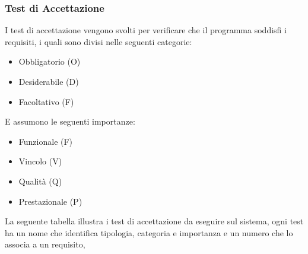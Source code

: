 \subsubsection{Test di Accettazione}
I test di accettazione vengono svolti per verificare che il programma soddisfi i requisiti, i quali sono divisi nelle seguenti categorie:
\begin{itemize}
    \item Obbligatorio (O)
    \item Desiderabile (D)
    \item Facoltativo (F)
\end{itemize}
E assumono le seguenti importanze:
\begin{itemize}
    \item Funzionale (F)
    \item Vincolo (V)
    \item Qualit\`a (Q)
    \item Prestazionale (P)
\end{itemize}
\newpage
La seguente tabella illustra i test di accettazione da eseguire sul sistema, ogni test ha un nome che identifica tipologia, categoria e importanza e un numero che lo associa a un requisito,

